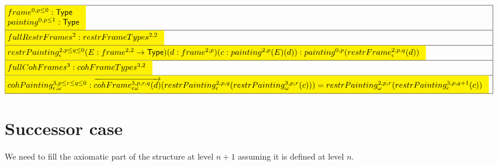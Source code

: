 \documentclass[a4paper,english,cleveref,autoref,thm-restate]{article}
\newcommand{\Type}{\mathsf{Type}}
\begin{document}
\begin{tiny}
{$
  \begin{array}{|l|}
    \hline
    \!\!\!\colorbox{yellow}{$
      \!\!\!
      \begin{array}{l}
        frame^{0,p\leq 0}:\Type\\
        painting^{0,p\leq 1}:\Type\\
      \end{array}
    $}\\
    \hline
    \!\!\!\colorbox{yellow}{$
      \!\!\!
      \begin{array}[t]{l}
        fullRestrFrames^{2}:restrFrameTypes^{2,2}\\
      \end{array}
    $}\\
    \hline
    \!\!\!\colorbox{yellow}{$
      \!\!\!
      \begin{array}{l}
        restrPainting^{2,p\leq q \leq 0}_\epsilon(E:frame^{2,2}\rightarrow \Type)(d:frame^{2,p})(c:painting^{2,p}(E)(d)): painting^{0,p}(restrFrame^{2,p,q}_{\epsilon}(d))\\
      \end{array}
    $}\!\!\!\\
    \hline
    \!\!\!\colorbox{yellow}{$
      \!\!\!
      \begin{array}{l}
        fullCohFrames^{3}:cohFrameTypes^{3,2}\\
      \end{array}
    $}\\
    \hline
    \!\!\!\colorbox{yellow}{$
      \!\!\!
      \begin{array}{l}
        cohPainting_{\epsilon,\omega}^{3,p\leq r\leq q\leq 0}: \overrightarrow{cohFrame^{3,p,r,q}_{\epsilon\omega}(d)}(restrPainting^{2,p,q}_{\epsilon}(restrPainting^{3,p,r}_{\omega}(c))) = restrPainting^{2,p,r}_{\omega}(restrPainting^{3,p,q+1}_{\epsilon}(c))\\
      \end{array}
    $}\\
    \hline
  \end{array}
$
}
\end{tiny}

\section{Successor case}

We need to fill the axiomatic part of the structure at level $n+1$
assuming it is defined at level $n$.
\end{document}
